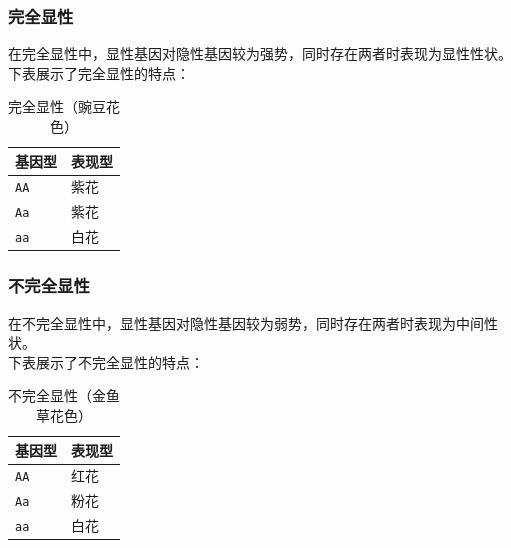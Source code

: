 \documentclass[UTF8]{ctexart}
\begin{document}
\subsubsection{完全显性}
    在完全显性中，显性基因对隐性基因较为强势，同时存在两者时表现为显性性状。\\[3mm]
    下表展示了完全显性的特点：
    \begin{table}[h]
        \begin{center}
            \begin{tabular}{l|l}
                \hline
                基因型\qquad\qquad\qquad&表现型\qquad\qquad\qquad\\ \hline
                \texttt{AA}&紫花\\ \hline
                \texttt{Aa}&紫花\\ \hline
                \texttt{aa}&白花\\ \hline
            \end{tabular}
            \caption{完全显性（豌豆花色）}
        \end{center}
    \end{table}\vspace{-20pt}

\subsubsection{不完全显性}
    在不完全显性中，显性基因对隐性基因较为弱势，同时存在两者时表现为中间性状。\\[3mm]
    下表展示了不完全显性的特点：
    \begin{table}[h]
        \begin{center}
            \begin{tabular}{l|l}
                \hline
                基因型\qquad\qquad\qquad&表现型\qquad\qquad\qquad\\ \hline
                \texttt{AA}&红花\qquad\\ \hline
                \texttt{Aa}&粉花\qquad\\ \hline
                \texttt{aa}&白花\qquad\\ \hline
            \end{tabular}
            \caption{不完全显性（金鱼草花色）}
        \end{center}
    \end{table}\vspace{-20pt}
\end{document}
